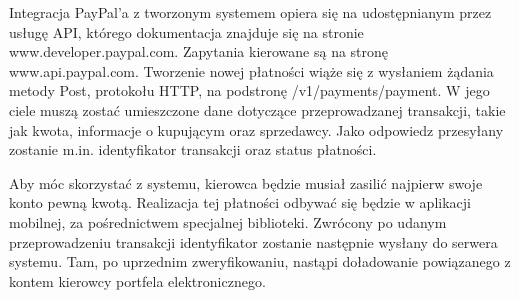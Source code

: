 Integracja PayPal'a z tworzonym systemem opiera się na udostępnianym przez usługę API, którego dokumentacja znajduje się na stronie www.developer.paypal.com. Zapytania kierowane są na stronę www.api.paypal.com. Tworzenie nowej płatności wiąże się z wysłaniem żądania metody Post, protokołu HTTP, na podstronę /v1/payments/payment. W jego ciele muszą zostać umieszczone dane dotyczące przeprowadzanej transakcji, takie jak kwota, informacje o kupującym oraz sprzedawcy. Jako odpowiedz przesyłany zostanie m.in. identyfikator transakcji oraz status płatności. 

Aby móc skorzystać z systemu, kierowca będzie musiał zasilić najpierw swoje konto pewną kwotą. Realizacja tej płatności odbywać się będzie w aplikacji mobilnej, za pośrednictwem specjalnej biblioteki. Zwrócony po udanym przeprowadzeniu transakcji identyfikator zostanie następnie wysłany do serwera systemu. Tam, po uprzednim zweryfikowaniu, nastąpi doładowanie powiązanego z kontem kierowcy portfela elektronicznego. 